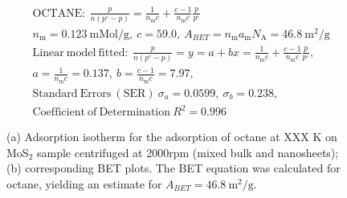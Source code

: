 

\begin{align*}
&\mathrm{OCTANE:}\ \frac{p}{n(p^\circ-p)}=\frac{1}{n_\mathrm{m}c}+\frac{c-1}{n_\mathrm{m}c}\frac{p}{p^\circ}\\
&{n_\mathrm{m}}=0.123\ \mathrm{mMol/g},\ c=59.0,\ A_{BET}={n_\mathrm{m}}{a_\mathrm{m}}{N_\mathrm{A}}=46.8\ \mathrm{m}^2\mathrm{/g}\\
&\mathrm{Linear\ model\ fitted:}\ \frac{p}{n(p^\circ-p)}=y=a+bx=\frac{1}{n_\mathrm{m}c}+\frac{c-1}{n_\mathrm{m}c}\frac{p}{p^\circ},\\
&a=\frac{1}{n_\mathrm{m}c}=0.137,\ b=\frac{c-1}{n_\mathrm{m}c}=7.97,\\
&\mathrm{Standard\ Errors\ (SER)}\ \sigma_a=0.0599,\ \sigma_b=0.238,\\
&\mathrm{Coefficient\ of\ Determination}\ R^2 = 0.996
\end{align*}


\begin{figure}[htb]
\hfill
{}
\caption{(a) Adsorption isotherm for the adsorption of octane at XXX K on MoS$_2$ 
sample centrifuged at 2000rpm (mixed bulk and nanosheets);
(b) corresponding BET plots. The BET equation was calculated for octane, yielding an estimate for $A_{BET}=46.8\ \mathrm{m}^2\mathrm{/g}$.}

\label{fig:sa-Nanosheets-Prep-II-2000rpm-12mg-01-3mm-30C-S2-SA-10ml}
\end{figure}


